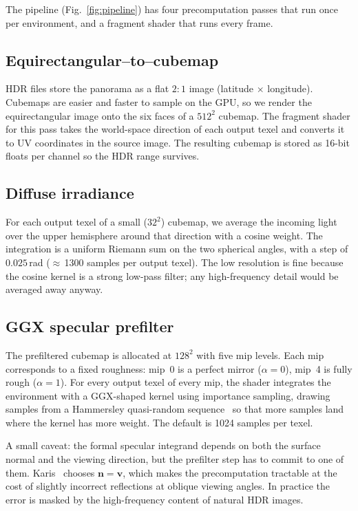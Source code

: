 \documentclass{egpubl}
\begin{document}
The pipeline (Fig.~\ref{fig:pipeline}) has four precomputation passes that run
once per environment, and a fragment shader that runs every frame.

\subsection{Equirectangular--to--cubemap}

HDR files store the panorama as a flat $2{:}1$ image (latitude $\times$
longitude). Cubemaps are easier and faster to sample on the GPU, so we render
the equirectangular image onto the six faces of a $512^2$ cubemap. The
fragment shader for this pass takes the world-space direction of each output
texel and converts it to UV coordinates in the source image. The resulting
cubemap is stored as 16-bit floats per channel so the HDR range survives.

\subsection{Diffuse irradiance}

For each output texel of a small ($32^2$) cubemap, we average the incoming
light over the upper hemisphere around that direction with a cosine weight.
The integration is a uniform Riemann sum on the two spherical angles, with a
step of $0.025$\,rad ($\approx$\,1300 samples per output texel). The low
resolution is fine because the cosine kernel is a strong low-pass filter; any
high-frequency detail would be averaged away anyway.

\subsection{GGX specular prefilter}

The prefiltered cubemap is allocated at $128^2$ with five mip levels. Each
mip corresponds to a fixed roughness: mip~0 is a perfect mirror
($\alpha=0$), mip~4 is fully rough ($\alpha=1$). For every output texel of
every mip, the shader integrates the environment with a GGX-shaped kernel
using importance sampling, drawing samples from a Hammersley quasi-random
sequence~\cite{Hammersley1964} so that more samples land where the kernel
has more weight. The default is 1024 samples per texel.

A small caveat: the formal specular integrand depends on both the surface
normal and the viewing direction, but the prefilter step has to commit to
one of them. Karis~\cite{Karis2013} chooses $\mathbf{n}=\mathbf{v}$, which
makes the precomputation tractable at the cost of slightly incorrect
reflections at oblique viewing angles. In practice the error is masked by
the high-frequency content of natural HDR images.
\end{document}
